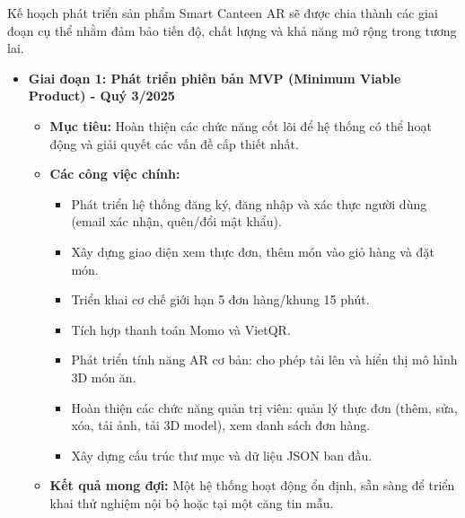 \documentclass[12pt,a4paper]{article}
\begin{document}
Kế hoạch phát triển sản phẩm Smart Canteen AR sẽ được chia thành các giai đoạn cụ thể nhằm đảm bảo tiến độ, chất lượng và khả năng mở rộng trong tương lai.
\begin{itemize}[label=\textbullet]
    \item \textbf{Giai đoạn 1: Phát triển phiên bản MVP (Minimum Viable Product) - Quý 3/2025}
    \begin{itemize}[label=\textendash]
        \item \textbf{Mục tiêu:} Hoàn thiện các chức năng cốt lõi để hệ thống có thể hoạt động và giải quyết các vấn đề cấp thiết nhất.
        \item \textbf{Các công việc chính:}
        \begin{itemize}[label=\textrightarrow]
            \item Phát triển hệ thống đăng ký, đăng nhập và xác thực người dùng (email xác nhận, quên/đổi mật khẩu).
            \item Xây dựng giao diện xem thực đơn, thêm món vào giỏ hàng và đặt món.
            \item Triển khai cơ chế giới hạn 5 đơn hàng/khung 15 phút.
            \item Tích hợp thanh toán Momo và VietQR.
            \item Phát triển tính năng AR cơ bản: cho phép tải lên và hiển thị mô hình 3D món ăn.
            \item Hoàn thiện các chức năng quản trị viên: quản lý thực đơn (thêm, sửa, xóa, tải ảnh, tải 3D model), xem danh sách đơn hàng.
            \item Xây dựng cấu trúc thư mục và dữ liệu JSON ban đầu.
        \end{itemize}
        \item \textbf{Kết quả mong đợi:} Một hệ thống hoạt động ổn định, sẵn sàng để triển khai thử nghiệm nội bộ hoặc tại một căng tin mẫu.
    \end{itemize}


\end{itemize}
\end{document}

